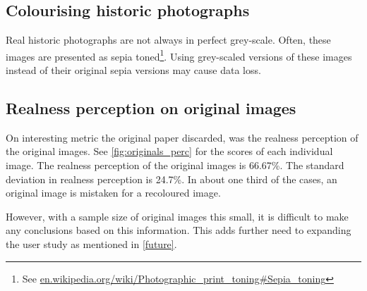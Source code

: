 \documentclass{article}
\begin{document}
    \subsection{Colourising historic photographs}
        Real historic photographs are not always in perfect grey-scale. Often, these images are presented as sepia toned\footnote{See \href{https://en.wikipedia.org/wiki/Photographic\_print\_toning\#Sepia_toning}{en.wikipedia.org/wiki/Photographic\_print\_toning\#Sepia\_toning}}. Using grey-scaled versions of these images instead of their original sepia versions may cause data loss.
    
    \subsection{Realness perception on original images}
        On interesting metric the original paper discarded, was the realness perception of the original images. See \ref{fig:originals_perc} for the scores of each individual image. The realness perception of the original images is 66.67\%.  The standard deviation in realness perception is 24.7\%.  In about one third of the cases, an original image is mistaken for a recoloured image. 
        
       However, with a sample size of original images this small, it is difficult to make any conclusions based on this information. This adds further need to expanding the user study as mentioned in \ref{future}.
       
\end{document}

